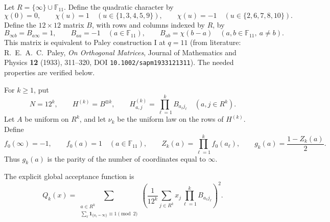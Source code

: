 \begin{definition}
\label{ian:hadamard-paley-tensor}
Let \(R=\{\infty\}\cup\mathbb F_{11}\). Define the quadratic character by
\[
 \chi(0)=0,\qquad
 \chi(u)=1\quad(u\in\{1,3,4,5,9\}),\qquad
 \chi(u)=-1\quad(u\in\{2,6,7,8,10\}).
\]
Define the \(12\times12\) matrix \(B\), with rows and columns indexed by \(R\), by
\[
 B_{\infty b}=B_{a\infty}=1,\qquad
 B_{aa}=-1\quad(a\in\mathbb F_{11}),\qquad
 B_{ab}=\chi(b-a)\quad(a,b\in\mathbb F_{11},\ a\ne b).
\]
This matrix is equivalent to Paley construction I at \(q=11\) (from literature:
R.~E.~A.~C.~Paley, \emph{On Orthogonal Matrices},
Journal of Mathematics and Physics \textbf{12} (1933), 311--320,
DOI \texttt{10.1002/sapm1933121311}).
The needed properties are verified below.

For \(k\ge1\), put
\[
 N=12^k,\qquad H^{(k)}=B^{\otimes k},
 \qquad
 H^{(k)}_{a,j}=\prod_{\ell=1}^kB_{a_\ell j_\ell}
 \quad(a,j\in R^k).
\]
Let \(A\) be uniform on \(R^k\), and let \(\nu_k\) be the uniform law on the rows of \(H^{(k)}\). Define
\[
 f_0(\infty)=-1,\qquad f_0(a)=1\quad(a\in\mathbb F_{11}),
 \qquad
 Z_k(a)=\prod_{\ell=1}^kf_0(a_\ell),
 \qquad
 g_k(a)=\frac{1-Z_k(a)}2 .
\]
Thus \(g_k(a)\) is the parity of the number of coordinates equal to \(\infty\).

The explicit global acceptance function is
\[
 Q_k(x)=
 \sum_{\substack{a\in R^k\\
       \sum_\ell\mathbf1_{\{a_\ell=\infty\}}\equiv1\pmod2}}
 \left(
 \frac1{12^k}\sum_{j\in R^k}
 x_j\prod_{\ell=1}^kB_{a_\ell j_\ell}
 \right)^2 .
 \tag{34.3}
\]
\end{definition}

